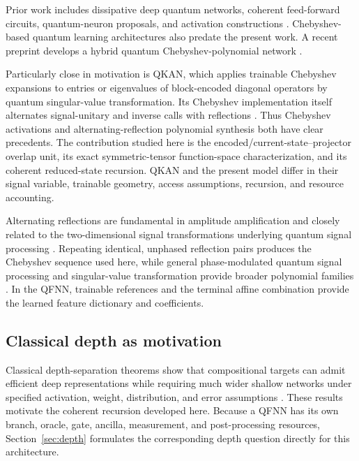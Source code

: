 \documentclass[pdflatex,sn-mathphys,NameDate,iicol]{sn-jnl}
\begin{document}
Prior work includes dissipative deep quantum networks, coherent feed-forward
circuits, quantum-neuron proposals, and activation constructions
\citep{beer2020training,tacchino2020feedforward,singh2024coherent,
cao2017neuron,maronese2022activation}. Chebyshev-based quantum learning
architectures also predate the present work. A recent preprint develops a
hybrid quantum Chebyshev-polynomial network \citep{li2024qcpn}.

Particularly close in motivation is QKAN, which applies trainable Chebyshev
expansions to entries or eigenvalues of block-encoded diagonal operators by
quantum singular-value transformation. Its Chebyshev implementation itself
alternates signal-unitary and inverse calls with reflections
\citep{ivashkov2026qkan,gilyen2019qsvt}. Thus Chebyshev activations and
alternating-reflection polynomial synthesis both have clear precedents. The
contribution studied here is the encoded/current-state--projector overlap
unit, its exact symmetric-tensor function-space characterization, and its
coherent reduced-state recursion. QKAN and the present model differ in their
signal variable, trainable geometry, access assumptions, recursion, and
resource accounting.

Alternating reflections are fundamental in amplitude amplification and
closely related to the two-dimensional signal transformations underlying
quantum signal processing \citep{brassard2002amplitude,low2017qsp}. Repeating
identical, unphased reflection pairs produces the Chebyshev sequence used
here, while general phase-modulated quantum signal processing and
singular-value transformation provide broader polynomial families
\citep{gilyen2019qsvt}. In the QFNN, trainable references and the terminal
affine combination provide the learned feature dictionary and coefficients.

\subsection{Classical depth as motivation}

Classical depth-separation theorems show that compositional targets can admit
efficient deep representations while requiring much wider shallow networks
under specified activation, weight, distribution, and error assumptions
\citep{telgarsky2016benefits,eldan2016power,daniely2017depth}. These results
motivate the coherent recursion developed here. Because a QFNN has its own
branch, oracle, gate, ancilla, measurement, and post-processing resources,
Section~\ref{sec:depth} formulates the corresponding depth question directly
for this architecture.
\end{document}
